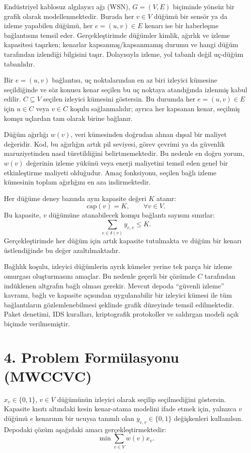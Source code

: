 \documentclass[11pt]{article}
\begin{document}
Endüstriyel kablosuz algılayıcı ağı (WSN), \(G=(V,E)\) biçiminde yönsüz bir grafik olarak modellenmektedir. Burada her \(v\in V\) düğümü bir sensör ya da izleme yapabilen düğümü, her \(e=(u,v)\in E\) kenarı ise bir haberleşme bağlantısını temsil eder. Gerçekleştirimde düğümler kimlik, ağırlık ve izleme kapasitesi taşırken; kenarlar kapsanmış/kapsanmamış durumu ve hangi düğüm tarafından izlendiği bilgisini taşır. Dolayısıyla izleme, yol tabanlı değil uç-düğüm tabanlıdır.

Bir \(e=(u,v)\) bağlantısı, uç noktalarından en az biri izleyici kümesine seçildiğinde ve söz konusu kenar seçilen bu uç noktaya atandığında izlenmiş kabul edilir. \(C\subseteq V\) seçilen izleyici kümesini göstersin. Bu durumda her \(e=(u,v)\in E\) için \(u\in C\) veya \(v\in C\) koşulu sağlanmalıdır; ayrıca her kapsanan kenar, seçilmiş komşu uçlardan tam olarak birine bağlanır.

Düğüm ağırlığı \(w(v)\), veri kümesinden doğrudan alınan dışsal bir maliyet değeridir. Kod, bu ağırlığın artık pil seviyesi, görev çevrimi ya da güvenlik maruziyetinden nasıl türetildiğini belirtmemektedir. Bu nedenle en doğru yorum, \(w(v)\) değerinin izleme yükünü veya enerji maliyetini temsil eden genel bir etkinleştirme maliyeti olduğudur. Amaç fonksiyonu, seçilen bağlı izleme kümesinin toplam ağırlığını en aza indirmektedir.

Her düğüme deney bazında aynı kapasite değeri \(K\) atanır:
\[
\mathrm{cap}(v)=K,\qquad \forall v\in V.
\]
Bu kapasite, \(v\) düğümüne atanabilecek komşu bağlantı sayısını sınırlar:
\[
\sum_{e\in \delta(v)} y_{e,v}\le K.
\]
Gerçekleştirimde her düğüm için artık kapasite tutulmakta ve düğüm bir kenarı üstlendiğinde bu değer azaltılmaktadır.

Bağlılık koşulu, izleyici düğümlerin ayrık kümeler yerine tek parça bir izleme omurgası oluşturmasını amaçlar. Bu nedenle geçerli bir çözümde \(C\) tarafından indüklenen altgrafın bağlı olması gerekir. Mevcut depoda ``güvenli izleme'' kavramı, bağlı ve kapasite açısından uygulanabilir bir izleyici kümesi ile tüm bağlantıların gözlemlenebilmesi şeklinde grafik düzeyinde temsil edilmektedir. Paket denetimi, IDS kuralları, kriptografik protokoller ve saldırgan modeli açık biçimde verilmemiştir.

\section*{4. Problem Formülasyonu (MWCCVC)}

\(x_v\in\{0,1\}\), \(v\in V\) düğümünün izleyici olarak seçilip seçilmediğini göstersin. Kapasite kısıtı altındaki kesin kenar-atama modelini ifade etmek için, yalnızca \(v\) düğümü \(e\) kenarının bir ucuysa tanımlı olan \(y_{e,v}\in\{0,1\}\) değişkenleri kullanılsın. Depodaki çözüm aşağıdaki amacı gerçekleştirmektedir:
\[
\min \sum_{v\in V} w(v)x_v.
\]
\end{document}

